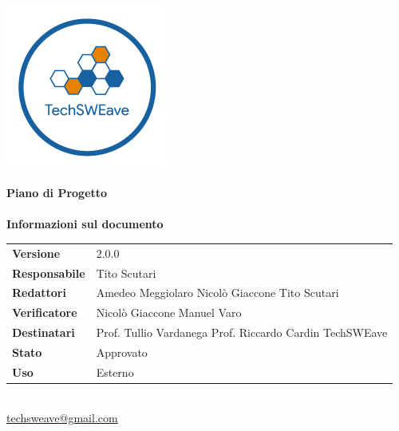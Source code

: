 \documentclass[a4paper]{article}
\begin{document}
\begin{titlepage}
    \begin{center}
        \includegraphics{../../../Images/logo}\\
        \vspace{20px}
        \textcolor{logo}{\hrulefill}\\
        \vspace{20px}
        \textbf{\huge\textcolor{logo}{Piano di Progetto}}\\
        \vspace{10px}
        \textcolor{logo}{\hrulefill}\\
        \vspace{40px}
        \textbf{\Large Informazioni sul documento}\\
        \vspace{20px}
        \begin{tabular}{p{100px} | p{100px}}
            \textbf{Versione}     & 2.0.0                                                                     \\
            \textbf{Responsabile} & Tito Scutari                                                              \\
            \textbf{Redattori}    & Amedeo Meggiolaro \newline Nicolò Giaccone \newline Tito Scutari          \\
            \textbf{Verificatore} & Nicolò Giaccone \newline Manuel Varo                                      \\
            \textbf{Destinatari}  & Prof. Tullio Vardanega \newline Prof. Riccardo Cardin \newline TechSWEave \\
            \textbf{Stato}        & Approvato                                                                 \\
            \textbf{Uso}          & Esterno                                                                   \\
        \end{tabular}\\
        \vspace{60px}
        \href{mailto:techsweave@gmail.com}{techsweave@gmail.com}\\

    \end{center}
\end{titlepage}
\end{document}
